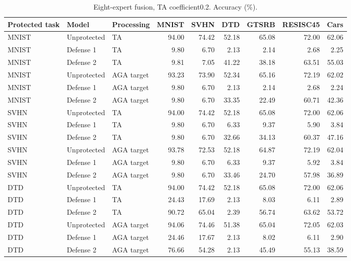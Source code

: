 \begin{table}[t]
\centering\small
\caption{Eight-expert fusion, TA coefficient0.2. Accuracy (\%).}
\begin{tabular}{lllrrrrrr}
\toprule
Protected task & Model & Processing & MNIST & SVHN & DTD & GTSRB & RESISC45 & Cars \\
\midrule
MNIST & Unprotected & TA & 94.00 & 74.42 & 52.18 & 65.08 & 72.00 & 62.06 \\
MNIST & Defense 1 & TA & 9.80 & 6.70 & 2.13 & 2.14 & 2.68 & 2.25 \\
MNIST & Defense 2 & TA & 9.81 & 7.05 & 41.22 & 38.18 & 63.51 & 55.03 \\
MNIST & Unprotected & AGA target & 93.23 & 73.90 & 52.34 & 65.16 & 72.19 & 62.02 \\
MNIST & Defense 1 & AGA target & 9.80 & 6.70 & 2.13 & 2.14 & 2.68 & 2.24 \\
MNIST & Defense 2 & AGA target & 9.80 & 6.70 & 33.35 & 22.49 & 60.71 & 42.36 \\
SVHN & Unprotected & TA & 94.00 & 74.42 & 52.18 & 65.08 & 72.00 & 62.06 \\
SVHN & Defense 1 & TA & 9.80 & 6.70 & 6.33 & 9.37 & 5.90 & 3.84 \\
SVHN & Defense 2 & TA & 9.80 & 6.70 & 32.66 & 34.13 & 60.37 & 47.16 \\
SVHN & Unprotected & AGA target & 93.78 & 72.53 & 52.18 & 64.87 & 72.19 & 62.04 \\
SVHN & Defense 1 & AGA target & 9.80 & 6.70 & 6.33 & 9.37 & 5.92 & 3.84 \\
SVHN & Defense 2 & AGA target & 9.80 & 6.70 & 33.46 & 24.70 & 57.98 & 36.89 \\
DTD & Unprotected & TA & 94.00 & 74.42 & 52.18 & 65.08 & 72.00 & 62.06 \\
DTD & Defense 1 & TA & 24.43 & 17.69 & 2.13 & 8.03 & 6.11 & 2.89 \\
DTD & Defense 2 & TA & 90.72 & 65.04 & 2.39 & 56.74 & 63.62 & 53.72 \\
DTD & Unprotected & AGA target & 94.06 & 74.46 & 51.38 & 65.04 & 72.05 & 62.03 \\
DTD & Defense 1 & AGA target & 24.46 & 17.67 & 2.13 & 8.02 & 6.11 & 2.90 \\
DTD & Defense 2 & AGA target & 76.66 & 54.28 & 2.13 & 45.49 & 55.13 & 38.59 \\
\bottomrule
\end{tabular}
\end{table}
